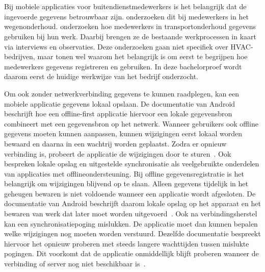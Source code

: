 \chapter{}%
\label{ch:stand-van-zaken}


Bij mobiele applicaties voor buitendienstmedewerkers is het belangrijk dat de ingevoerde gegevens betrouwbaar zijn.
\textcite{KnowlesEtAl2014} onderzoeken dit bij medewerkers in het wegenonderhoud. \textcite{HardingEtAl2019} onderzoeken
hoe medewerkers in transportonderhoud gegevens gebruiken bij hun werk. Daarbij brengen ze de bestaande werkprocessen in kaart
via interviews en observaties. Deze onderzoeken gaan niet specifiek over HVAC-bedrijven, maar tonen wel waarom het belangrijk is om
eerst te begrijpen hoe medewerkers gegevens registreren en gebruiken. In deze bachelorproef wordt daarom eerst de huidige
werkwijze van het bedrijf onderzocht.

Om ook zonder netwerkverbinding gegevens te kunnen raadplegen, kan een mobiele applicatie gegevens lokaal opslaan.
De documentatie van Android beschrijft hoe een offline-first applicatie hiervoor een lokale gegevensbron combineert met
een gegevensbron op het netwerk. Wanneer gebruikers ook offline gegevens moeten kunnen aanpassen, kunnen wijzigingen
eerst lokaal worden bewaard en daarna in een wachtrij worden geplaatst. Zodra er opnieuw verbinding is, probeert de
applicatie de wijzigingen door te sturen~\autocite{Google2026OfflineFirst}. Ook \textcite{NingrumEtAl2026} bespreken
lokale opslag en uitgestelde synchronisatie als veelgebruikte onderdelen van applicaties met offlineondersteuning.
Bij offline gegevensregistratie is het belangrijk om wijzigingen blijvend op te slaan.
Alleen gegevens tijdelijk in het geheugen bewaren is niet
voldoende wanneer een applicatie wordt afgesloten. De documentatie van
Android beschrijft daarom lokale opslag op het apparaat en het bewaren
van werk dat later moet worden uitgevoerd~\autocite{Google2026OfflineFirst}.
Ook na verbindingsherstel kan een synchronisatiepoging mislukken.
De applicatie moet dan kunnen bepalen welke wijzigingen nog moeten
worden verstuurd. Dezelfde documentatie bespreekt hiervoor het opnieuw
proberen met steeds langere wachttijden tussen mislukte pogingen.
Dit voorkomt dat de applicatie onmiddellijk blijft proberen wanneer
de verbinding of server nog niet beschikbaar is~\autocite{Google2026OfflineFirst}.

